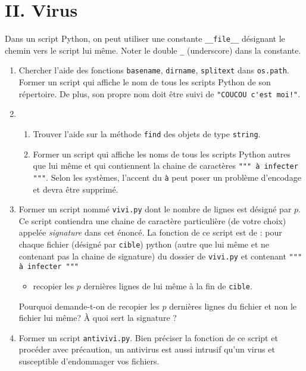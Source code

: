 \section*{II. Virus}
Dans un script Python, on peut utiliser une constante \verb|__file__| désignant le chemin vers le script lui même. Noter le double \verb|_| (underscore) dans la constante.
\begin{enumerate}
  \item Chercher l'aide des fonctions \verb|basename|, \verb|dirname|, \verb|splitext| dans \verb|os.path|. Former un script qui affiche le nom de tous les scripts Python de son répertoire. De plus, son propre nom doit être suivi de \verb|"COUCOU c'est moi!"|. 
  \item 
\begin{enumerate}
  \item Trouver l'aide sur la méthode \verb|find| des objets de type \verb|string|.
  \item Former un script qui affiche les noms de tous les scripts Python autres que lui même et qui contiennent la chaine de caractères \verb|""" à infecter """|. Selon les systèmes, l'accent du \verb|à| peut poser un problème d'encodage et devra être supprimé.
\end{enumerate}

  \item Former un script nommé \verb|vivi.py| dont le nombre de lignes est désigné par $p$. Ce script contiendra une chaine de caractère particulière (de votre choix) appelée \emph{signature} dans cet énoncé. La fonction de ce script est de :\newline
  pour chaque fichier (désigné par \verb|cible|) python (autre que lui même et ne contenant pas la chaine de signature) du dossier de \verb|vivi.py| et contenant \verb|""" à infecter """| 
  \begin{itemize}
    \item recopier les $p$ dernières lignes de lui même à la fin de \verb|cible|.
  \end{itemize}
Pourquoi demande-t-on de recopier les $p$ dernières lignes du fichier et non le fichier lui même? \`A quoi sert la signature ?

  \item Former un script \verb|antivivi.py|. Bien préciser la fonction de ce script et procéder avec précaution, un antivirus est aussi intrusif qu'un virus et susceptible d'endommager vos fichiers.
\end{enumerate}
